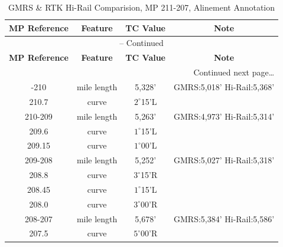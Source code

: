 \begin{center}
\begin{longtable}{c c c c}
\caption[GMRS \& RTK Hi-Rail Comparision, MP 211-207, Alinement Annotation]{GMRS \& RTK Hi-Rail Comparision, MP 211-207, Alinement Annotation}
\label{tab:gmre_Hi-RailTrav} \\
\hline
   \multicolumn{1}{c}{\textbf{MP Reference}} &
   \multicolumn{1}{c}{\textbf{Feature}} &
   \multicolumn{1}{c}{\textbf{TC Value}} &
   \multicolumn{1}{c}{\textbf{Note}} \\
\hline
\endfirsthead

\multicolumn{4}{c}{{\tablename} \thetable{} -- Continued} \\[0.5ex]
   \multicolumn{1}{c}{\textbf{MP Reference}} &
   \multicolumn{1}{c}{\textbf{Feature}} &
   \multicolumn{1}{c}{\textbf{TC Value}} &
   \multicolumn{1}{c}{\textbf{Note}} \\
\hline
\endhead

\midrule
\multicolumn{4}{r}{{Continued next page\ldots}} \\
\endfoot

\bottomrule
\endlastfoot
	211-210 & mile length & 5,328' & GMRS:5,018' Hi-Rail:5,368' \\
	210.7     & curve &$2^{\circ}$15'L &\\
	210-209 & mile length & 5,263' & GMRS:4,973' Hi-Rail:5,314' \\
	209.6     & curve &$1^{\circ}$15'L &\\
	209.15   & curve &$1^{\circ}$00'L &\\
	209-208 & mile length & 5,252' & GMRS:5,027' Hi-Rail:5,318' \\
	208.8     & curve &$3^{\circ}$15'R &\\
	208.45   & curve &$1^{\circ}$15'L &\\ 
	208.0     & curve &$3^{\circ}$00'R &\\ 
	208-207 & mile length & 5,678' & GMRS:5,384' Hi-Rail:5,586' \\
	207.5     & curve &$5^{\circ}$00'R &\\ 
\end{longtable}
\end{center}
\vspace{-20pt}

